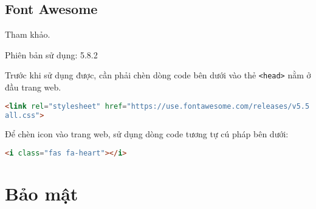 \subsection{Font Awesome}
Tham khảo\cite{awesome}.
\par
Phiên bản sử dụng: 5.8.2
\par
Trước khi sử dụng được, cần phải chèn dòng code bên dưới vào thẻ \texttt{<head>} nằm ở đầu trang web.
\begin{lstlisting}[language=HTML]
<link rel="stylesheet" href="https://use.fontawesome.com/releases/v5.5.0/css/
all.css">
\end{lstlisting}
\par
Để chèn icon vào trang web, sử dụng dòng code tương tự cú pháp bên dưới:
\begin{lstlisting}[language=HTML]
<i class="fas fa-heart"></i>
\end{lstlisting}
\section{Bảo mật}
